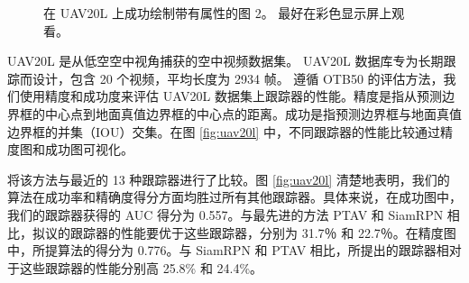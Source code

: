 \begin{figure}[t]
\begin{center}
\end{center}
   \caption{在 UAV20L 上成功绘制带有属性的图 2。 最好在彩色显示屏上观看。}
\label{fig:uav20l_attr}
\end{figure}

UAV20L \cite{mueller2016benchmark} 是从低空空中视角捕获的空中视频数据集。 UAV20L 数据库专为长期跟踪而设计，包含 20 个视频，平均长度为 2934 帧。
遵循 OTB50 \cite{OTB} 的评估方法，我们使用精度和成功度来评估 UAV20L 数据集上跟踪器的性能。精度是指从预测边界框的中心点到地面真值边界框的中心点的距离。成功是指预测边界框与地面真值边界框的并集​​（IOU）交集。在图 \ref{fig:uav20l} 中，不同跟踪器的性能比较通过精度图和成功图可视化。

将该方法与最近的 13 种跟踪器进行了比较。图 \ref{fig:uav20l} 清楚地表明，我们的算法在成功率和精确度得分方面均胜过所有其他跟踪器。具体来说，在成功图中，我们的跟踪器获得的 AUC 得分为 0.557。与最先进的方法 PTAV \cite{fan2018parallel} 和 SiamRPN \cite{SiamRPN} 相比，拟议的跟踪器的性能要优于这些跟踪器，分别为 31.7％ 和 22.7％。在精度图中，所提算法的得分为 0.776。与  SiamRPN \cite{SiamRPN} 和 PTAV \cite{fan2018parallel} 相比，所提出的跟踪器相对于这些跟踪器的性能分别高 25.8\% 和 24.4\%。

